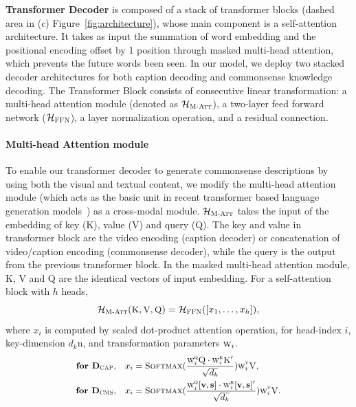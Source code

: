     
    \noindent\textbf{Transformer Decoder}
    is composed of a stack of transformer blocks (dashed area in (c) Figure~\ref{fig:architecture}), whose main component is a self-attention architecture.
    It takes as input the summation of word embedding and the positional encoding offset by 1 position through masked multi-head attention, which prevents the future words been seen. 
    In our model, we deploy two stacked decoder architectures for both caption decoding and commonsense knowledge decoding.
    The Transformer Block consists of consecutive linear transformation: a multi-head attention module (denoted as $\mathcal{H}_{\textsc{M-Att}}$), a two-layer feed forward network ($\mathcal{H}_{\textsc{FFN}}$), a layer normalization operation, and a residual connection.
        
    \paragraph{Multi-head Attention module} 
    To enable our transformer decoder to generate commonsense descriptions by using both the visual and textual content, we modify the multi-head attention module (which acts as the basic unit in recent transformer based language generation models~\cite{radford2018improving,radford2019language}) as a cross-modal module.
    $\mathcal{H}_{\textsc{M-Att}}$ takes the input of the embedding of key (K), value (V) and query (Q).
    The key and value in transformer block are the video encoding (caption decoder) or concatenation of video/caption encoding (commonsense decoder), while the query is the output from the previous transformer block. 
    In the masked multi-head attention module, K, V and Q are the identical vectors of input embedding.
    For a self-attention block with $h$ heads,
        \begin{equation}
        \small
            \mathcal{H}_{\textsc{M-Att}}(\textsc{K}, \textsc{V}, \textsc{Q}) = \mathcal{H}_{\textsc{FFN}}([x_1,\dots, x_h]),
        \end{equation}
        where $x_i$ is computed by scaled dot-product attention operation, for head-index $i$, key-dimension $d_k$n, and transformation parameters $\textsc{w}_i$. 
        \begin{equation}
        \small
        \begin{split}
            \textbf{for } \mathbf{D}_{\textsc{CAP}}, &\quad {x_i} = \textsc{Softmax}(\frac{\textsc{w}^\textsc{q}_i \textsc{Q}\cdot \textsc{w}^\textsc{k}_i \textsc{K}^\prime}{\sqrt{d_k}})\textsc{w}^\textsc{v}_i \textsc{V}, \\
            \textbf{for } \mathbf{D}_{\textsc{CMS}}, &\quad {x_i} = \textsc{Softmax}(\frac{\textsc{w}^\textsc{q}_i [\mathbf{v},  \mathbf{s}]\cdot \textsc{w}^\textsc{k}_i [\mathbf{v},  \mathbf{s}]^\prime}{\sqrt{d_k}})\textsc{w}^\textsc{v}_i \textsc{V}.
        \end{split}
        \nonumber
        \end{equation}
            
